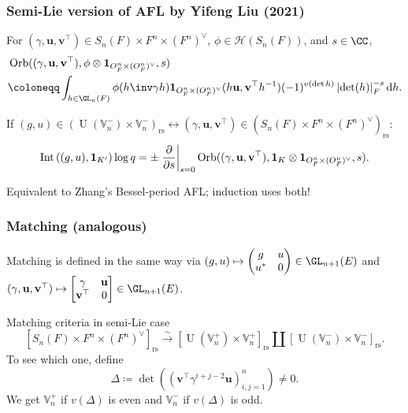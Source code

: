 \documentclass[11pt]{beamer}
\DeclareMathOperator{\Int}{Int}
\DeclareMathOperator{\Orb}{Orb}
\DeclareMathOperator{\U}{U}
\newcommand{\HH}{\mathcal{H}}
\newcommand{\VV}{\mathbb{V}}
\renewcommand{\OO}{O}
\newcommand{\guv}{{(\gamma, \uu, \vv^\top)}}
\newcommand{\oneV}{\mathbf{1}_{\OO_F^n \times (\OO_F^n)^\vee}}
\newcommand{\rs}{_{\text{rs}}}
\newcommand{\uu}{\mathbf{u}}
\newcommand{\vv}{\mathbf{v}}
\begin{document}
\begin{frame}
  \frametitle{Semi-Lie version of AFL by Yifeng Liu (2021)}
  \begin{definition}
  For $\guv \in S_n(F) \times F^n \times (F^n)^\vee$,
  $\phi \in \HH(S_n(F))$, and $s \in \CC$,
  \begin{align*}
    & \Orb((\gamma, \uu, \vv^\top), \phi \otimes \oneV, s) \\
    &\coloneqq \int_{h \in \GL_n(F)} \phi(h\inv \gamma h) \oneV(h \uu, \vv^\top h^{-1})
      (-1)^{v(\det h)} \left\lvert \det(h) \right\rvert_F^{-s} \odif h.
  \end{align*}
  \end{definition}

  \begin{theorem}
    If $(g, u) \in (\U(\VV_n^-) \times \VV_n^-)\rs \longleftrightarrow
      (\gamma, \uu, \vv^\top) \in (S_n(F) \times F^n \times (F^n)^\vee)\rs$:
    \[
      \Int\left( (g,u), \mathbf{1}_{K'} \right) \log q
      = \pm \left. \pdv{}{s} \right\rvert_{s=0}
      \Orb(\guv, \mathbf{1}_K \otimes \oneV, s).
    \]
  \end{theorem}
  Equivalent to Zhang's Bessel-period AFL; induction uses both!
\end{frame}

\begin{frame}
  \frametitle{Matching (analogous)}
  Matching is defined in the same way via
  $(g,u) \mapsto \begin{pmatrix} g & u \\ u^\ast & 0 \end{pmatrix} \in \GL_{n+1}(E)$
  and $\guv \mapsto \begin{bmatrix} \gamma & \uu \\ \vv^\top & 0 \end{bmatrix} \in \GL_{n+1}(E)$.

  \begin{block}{Matching criteria in semi-Lie case}
  \[ [S_n(F) \times F^n \times (F^n)^\vee]\rs \xrightarrow{\sim} [\U(\VV_n^+) \times \VV_n^+]\rs \amalg [\U(\VV_n^-) \times \VV_n^-]\rs. \]
  To see which one, define
  \[ \Delta \coloneqq \det \left( \left( \vv^\top \gamma^{i+j-2} \uu \right)_{i,j=1}^n \right) \neq 0. \]
  We get $\VV_n^+$ if $v(\Delta)$ is even
  and $\VV_n^-$ if $v(\Delta)$ is odd.
  \end{block}
\end{frame}
\end{document}
